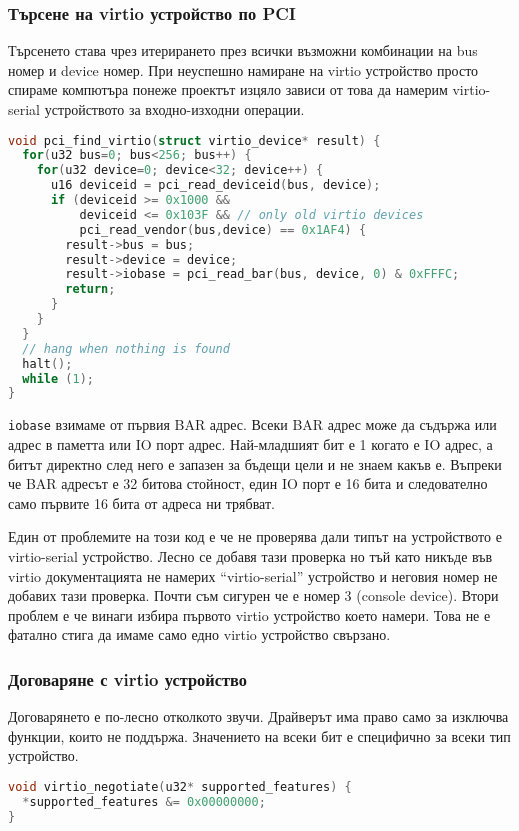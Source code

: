 \subsubsection{Търсене на virtio устройство по PCI}
Търсенето става чрез итерирането през всички възможни комбинации на bus номер и device номер. При неуспешно намиране на virtio устройство просто спираме компютъра понеже проектът изцяло зависи от това да намерим virtio-serial устройството за входно-изходни операции.
\begin{lstlisting}[language=C]
void pci_find_virtio(struct virtio_device* result) {
  for(u32 bus=0; bus<256; bus++) {
    for(u32 device=0; device<32; device++) {
      u16 deviceid = pci_read_deviceid(bus, device);
      if (deviceid >= 0x1000 &&
          deviceid <= 0x103F && // only old virtio devices
          pci_read_vendor(bus,device) == 0x1AF4) {
        result->bus = bus;
        result->device = device;
        result->iobase = pci_read_bar(bus, device, 0) & 0xFFFC;
        return;
      }
    }
  }
  // hang when nothing is found
  halt();
  while (1);
}
\end{lstlisting}
{\tt iobase} взимаме от първия BAR адрес. Всеки BAR адрес може да съдържа или адрес в паметта или IO порт адрес. Най-младшият бит е 1 когато е IO адрес, а битът директно след него е запазен за бъдещи цели и не знаем какъв е. Въпреки че BAR адресът е 32 битова стойност, един IO порт е 16 бита и следователно само първите 16 бита от адреса ни трябват.

Един от проблемите на този код е че не проверява дали типът на устройството е virtio-serial устройство. Лесно се добавя тази проверка но тъй като никъде във virtio документацията не намерих ``virtio-serial'' устройство и неговия номер не добавих тази проверка. Почти съм сигурен че е номер 3 (console device).
Втори проблем е че винаги избира първото virtio устройство което намери. Това не е фатално стига да имаме само едно virtio устройство свързано.

\subsubsection{Договаряне с virtio устройство}
Договарянето е по-лесно отколкото звучи. Драйверът има право само за изключва функции, които не поддържа. Значението на всеки бит е специфично за всеки тип устройство.
\begin{lstlisting}[language=C]
void virtio_negotiate(u32* supported_features) {
  *supported_features &= 0x00000000;
}
\end{lstlisting}

